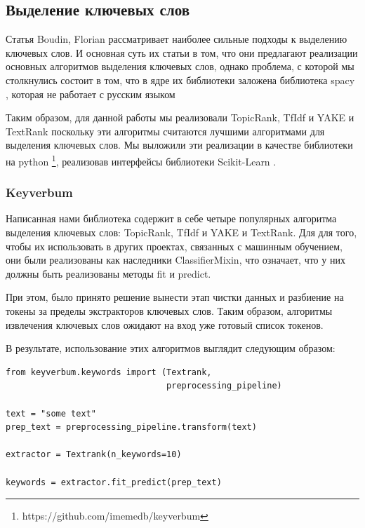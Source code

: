 \documentclass[14pt]{matmex-diploma-custom}
\begin{document}
\subsection{Выделение ключевых слов}

Статья Boudin, Florian \cite{boudin:2016:COLINGDEMO} рассматривает наиболее сильные подходы к выделению ключевых слов.
И основная суть их статьи в том, что они предлагают реализации основных алгоритмов выделения ключевых слов, однако проблема,
с которой мы столкнулись состоит в том, что в ядре их библиотеки заложена библиотека spacy \cite{honnibal-johnson:2015:EMNLP}, которая не работает с русским языком

Таким образом, для данной работы мы реализовали TopicRank, TfIdf и YAKE и TextRank поскольку эти алгоритмы считаются лучшими алгоритмами для выделения ключевых слов. Мы выложили эти реализации в качестве библиотеки на python \footnote{https://github.com/imemedb/keyverbum}, реализовав интерфейсы библиотеки Scikit-Learn \cite{scikit-learn, sklearn_api}.

\subsubsection{Keyverbum}
Написанная нами библиотека содержит в себе четыре популярных алгоритма выделения ключевых слов: TopicRank, TfIdf и YAKE и TextRank.
Для для того, чтобы их использовать в других проектах, связанных с машинным обучением, они были реализованы как наследники
ClassifierMixin, что означает, что у них должны быть реализованы методы fit и predict.

При этом, было принято решение вынести этап чистки данных и разбиение на токены за пределы экстракторов ключевых слов.
Таким образом, алгоритмы извлечения ключевых слов ожидают на вход уже готовый список токенов.

В результате, использование этих алгоритмов выглядит следующим образом:

\begin{verbatim}
from keyverbum.keywords import (Textrank, 
                                preprocessing_pipeline)

text = "some text"
prep_text = preprocessing_pipeline.transform(text)

extractor = Textrank(n_keywords=10)

keywords = extractor.fit_predict(prep_text)

\end{verbatim}
\end{document}
